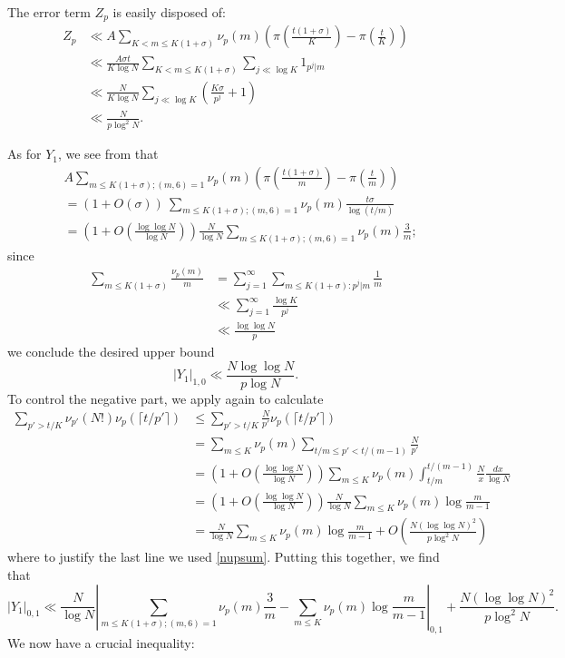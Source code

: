 \documentclass[12pt,a4paper,reqno]{amsart}
\numberwithin{equation}{section}
\theoremstyle{plain}
\theoremstyle{definition}
\begin{document}
The error term $Z_p$ is easily disposed of:
\begin{align*}
Z_p &\ll   A \sum_{K < m \leq K(1+\sigma)} \nu_p(m) \left(\pi\left(\frac{t(1+\sigma)}{K}\right)
- \pi\left(\frac{t}{K}\right) \right) \\
&\ll \frac{A\sigma t}{K \log N} \sum_{K < m \leq K(1+\sigma)} \sum_{j \ll \log K} 1_{p^j|m} \\
&\ll \frac{N}{K\log N} \sum_{j \ll \log K} (\frac{K\sigma}{p^j} + 1) \\
&\ll \frac{N}{p \log^2 N}.
\end{align*}

As for $Y_1$, we see from  that
\begin{align*}
&A \sum_{m \leq K(1+\sigma); (m,6)=1} \nu_p(m) \left(\pi\left(\frac{t(1+\sigma)}{m}\right) - \pi\left(\frac{t}{m}\right)\right) \\
&= \left(1 + O(\sigma)\right) \ \sum_{m \leq K(1+\sigma); (m,6)=1} \nu_p(m) \frac{t\sigma}{\log(t/m)}\\
&= \left(1 + O\left(\frac{\log \log N}{\log N}\right)\right) \frac{N}{\log N} \sum_{m \leq K(1+\sigma); (m,6)=1} \nu_p(m) \frac{3}{m};
\end{align*}
since
\begin{equation}\label{nupsum}
\begin{split}
  \sum_{m \leq K(1+\sigma)} \frac{\nu_p(m)}{m}
  &= \sum_{j=1}^\infty \sum_{m \leq K(1+\sigma): p^j|m} \frac{1}{m} \\
  &\ll \sum_{j=1}^\infty \frac{\log K}{p^j} \\
  &\ll \frac{\log\log N}{p}
\end{split}
\end{equation}
we conclude the desired upper bound
$$ |Y_1|_{1,0} \ll \frac{N \log\log N}{p \log N}.$$
To control the negative part, we apply  again to calculate
\begin{align*}
  \sum_{p' > t/K} \nu_{p'}(N!) \nu_p(\lceil t/p' \rceil)
  &\leq \sum_{p' > t/K} \frac{N}{p'} \nu_p(\lceil t/p' \rceil) \\
  &= \sum_{m \leq K} \nu_p(m) \sum_{t/m \leq p' < t/(m-1)} \frac{N}{p'} \\
  &= \left(1 + O\left(\frac{\log\log N}{\log N}\right)\right)\sum_{m \leq K} \nu_p(m) \int_{t/m}^{t/(m-1)} \frac{N}{x} \frac{dx}{\log N} \\
  &= \left(1 + O\left(\frac{\log\log N}{\log N}\right)\right) \frac{N}{\log N} \sum_{m \leq K} \nu_p(m) \log \frac{m}{m-1} \\
  &= \frac{N}{\log N} \sum_{m \leq K} \nu_p(m) \log \frac{m}{m-1} + O\left( \frac{N(\log\log N)^2}{p \log^2 N} \right)
\end{align*}
where to justify the last line we used \eqref{nupsum}.  Putting this together, we find that
\begin{equation}\label{y1b}|Y_1|_{0,1} \ll \frac{N}{\log N} |\sum_{m \leq K(1+\sigma); (m,6)=1} \nu_p(m) \frac{3}{m} - \sum_{m \leq K} \nu_p(m) \log \frac{m}{m-1} |_{0,1} + \frac{N(\log\log N)^2}{p \log^2 N}.
\end{equation}
We now have a crucial inequality:
\end{document}
